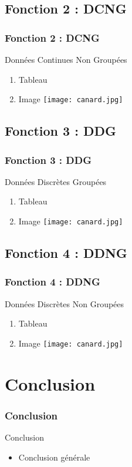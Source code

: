 \documentclass{beamer}
\begin{document}
\subsection{Fonction 2 : DCNG}
\begin{frame}[label=Fonction 2 : DCNG]
\frametitle{Fonction 2 : DCNG}
\begin{beamerboxesrounded}[shadow=true]{Données Continues Non Groupées}
		\begin{enumerate}
			\item Tableau
			\item Image
			\texttt{[image: canard.jpg]}		
		\end{enumerate}
\end{beamerboxesrounded}
\end{frame}


\subsection{Fonction 3 : DDG}
\begin{frame}[label=Fonction 3 : DDG]
\frametitle{Fonction 3 : DDG}
\begin{beamerboxesrounded}[shadow=true]{Données Discrètes Groupées}
		\begin{enumerate}
			\item Tableau
			\item Image
			\texttt{[image: canard.jpg]}		
		\end{enumerate}
\end{beamerboxesrounded}
\end{frame}


\subsection{Fonction 4 : DDNG}
\begin{frame}[label=Fonction 4 : DDNG]
\frametitle{Fonction 4 : DDNG}
\begin{beamerboxesrounded}[shadow=true]{Données Discrètes Non Groupées}
		\begin{enumerate}
			\item Tableau
			\item Image
			\texttt{[image: canard.jpg]}		
		\end{enumerate}
\end{beamerboxesrounded}
\end{frame}


\section{Conclusion}
\begin{frame}[label=Conclusion]

\frametitle{Conclusion}
\begin{beamerboxesrounded}[shadow=true]{Conclusion}
		\begin{itemize}
			\item Conclusion générale
		\end{itemize}
\end{beamerboxesrounded}
\end{frame}
\end{document}
